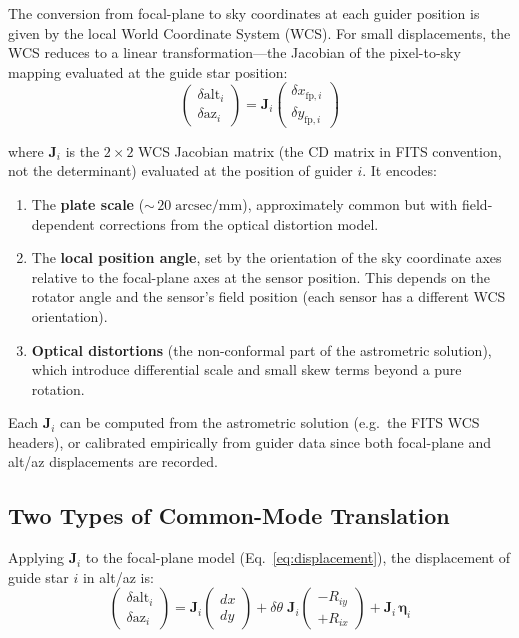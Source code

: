 \documentclass[SE,lsstdraft,authoryear,toc]{lsstdoc}
\newcommand{\Rix}{R_{ix}}
\newcommand{\Riy}{R_{iy}}
\begin{document}
The conversion from focal-plane to sky coordinates at each guider
position is given by the local World Coordinate System (WCS).  For
small displacements, the WCS reduces to a linear transformation---the
Jacobian of the pixel-to-sky mapping evaluated at the guide star
position:
\begin{equation}
\begin{pmatrix}
\delta\mathrm{alt}_i \\ \delta\mathrm{az}_i
\end{pmatrix}
= \mathbf{J}_i
\begin{pmatrix}
\delta x_{\mathrm{fp},i} \\ \delta y_{\mathrm{fp},i}
\end{pmatrix}
\label{eq:wcs_transform}
\end{equation}

\noindent
where $\mathbf{J}_i$ is the $2\times 2$ WCS Jacobian matrix (the CD
matrix in FITS convention, not the determinant) evaluated at the
position of guider $i$.  It
encodes:
\begin{enumerate}
\item The \textbf{plate scale} (${\sim}\,20\;\mathrm{arcsec/mm}$),
  approximately common but with field-dependent corrections from the
  optical distortion model.
\item The \textbf{local position angle}, set by the orientation of the
  sky coordinate axes relative to the focal-plane axes at the sensor
  position.  This depends on the rotator angle and the sensor's
  field position (each sensor has a different WCS orientation).
\item \textbf{Optical distortions} (the non-conformal part of the
  astrometric solution), which introduce differential scale and
  small skew terms beyond a pure rotation.
\end{enumerate}

\noindent
Each $\mathbf{J}_i$ can be computed from the astrometric solution
(e.g.\ the FITS WCS headers), or calibrated empirically from guider
data since both focal-plane and alt/az displacements are recorded.

\subsection{Two Types of Common-Mode Translation}
\label{sec:two_types}

Applying $\mathbf{J}_i$ to the focal-plane model
(Eq.~\ref{eq:displacement}), the displacement of guide star $i$ in
alt/az is:
\begin{equation}
\begin{pmatrix}
\delta\mathrm{alt}_i \\[2pt] \delta\mathrm{az}_i
\end{pmatrix}
= \mathbf{J}_i
\begin{pmatrix} dx \\ dy \end{pmatrix}
+ \delta\theta\;\mathbf{J}_i
\begin{pmatrix} -\Riy \\ +\Rix \end{pmatrix}
+ \mathbf{J}_i\,\symbf{\eta}_i
\label{eq:altaz_full}
\end{equation}
\end{document}
